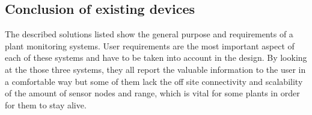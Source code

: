 \subsection{Conclusion of existing devices}

The described solutions listed show the general purpose and requirements of a plant monitoring systems. User requirements are the most important aspect of each of these systems and have to be taken into account in the design. By looking at the those three systems, they all report the valuable information to the user in a comfortable way but some of them lack the off site connectivity and scalability of the amount of sensor nodes and range, which is vital for some plants in order for them to stay alive. 
